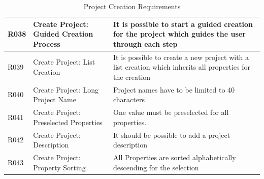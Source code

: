 \begin{table}[h]
\begin{tabular}{|l||p{5cm}|p{9cm}|}
		\\ \hline
		R038  	& Create Project: Guided Creation Process
		&It is possible to start a guided creation for the project which guides the user through each step
		\\ \hline
		R039  	& Create Project: List Creation
		&It is possible to create a new project with a list creation which inherits all properties for the creation
		\\ \hline
		R040  	& Create Project: Long Project Name
		&Project names have to be limited to 40 characters
		\\ \hline
		R041  	& Create Project: Preselected Properties
		&One value must be preselected for all properties.
		\\ \hline
		R042  	& Create Project: Description
		&It should be possible to add a project description
		\\ \hline
		R043  	& Create Project: Property Sorting
		&All Properties are sorted alphabetically descending for the selection
		\\ \hline
	\end{tabular} 
	\caption{Project Creation Requirements} 
	\label{projectrequirementsprojectcreation} 
\end{table}


